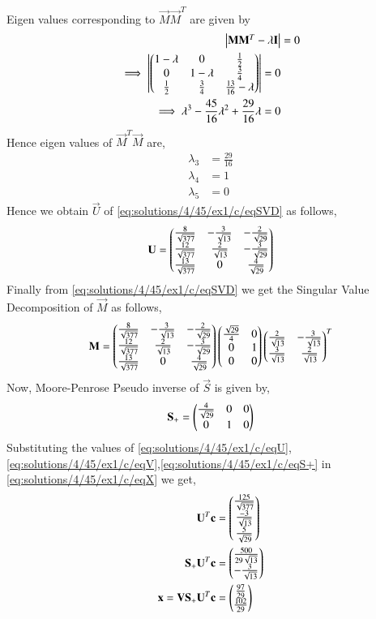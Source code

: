 Eigen values corresponding to $\vec{M}\Vec{M}^T$ are given by
\begin{align}
\begin{vmatrix}\mathbf{M}\mathbf{M}^T-\lambda\mathbf{I}\end{vmatrix} &= 0\\
\implies \begin{vmatrix}\begin{pmatrix}1-\lambda&0&\frac{1}{2}\\0&1-\lambda&\frac{3}{4}\\\frac{1}{2}&\frac{3}{4}&\frac{13}{16}-\lambda\end{pmatrix}\end{vmatrix}=0\\
\implies \lambda^3-\frac{45}{16}\lambda^2+\frac{29}{16}\lambda=0
\end{align}
Hence eigen values of $\vec{M}^T\vec{M}$ are,
\begin{align}
\lambda_3 &=\frac{29}{16}\\
\lambda_4 &= 1\\
\lambda_5 &= 0
\end{align}
Hence we obtain $\vec{U}$ of \eqref{eq:solutions/4/45/ex1/c/eqSVD} as follows,
\begin{align}
\mathbf{U}=\label{eq:solutions/4/45/ex1/c/eqU}\begin{pmatrix}\frac{8}{\sqrt{377}}&-\frac{3}{\sqrt{13}}&-\frac{2}{\sqrt{29}}\\\frac{12}{\sqrt{377}}&\frac{2}{\sqrt{13}}&-\frac{3}{\sqrt{29}}\\\frac{13}{\sqrt{377}}&0&\frac{4}{\sqrt{29}}\end{pmatrix}
\end{align}
Finally from \eqref{eq:solutions/4/45/ex1/c/eqSVD} we get the Singular Value Decomposition of $\vec{M}$ as follows,
\begin{align}
\mathbf{M} = \begin{pmatrix}\frac{8}{\sqrt{377}}&-\frac{3}{\sqrt{13}}&-\frac{2}{\sqrt{29}}\\\frac{12}{\sqrt{377}}&\frac{2}{\sqrt{13}}&-\frac{3}{\sqrt{29}}\\\frac{13}{\sqrt{377}}&0&\frac{4}{\sqrt{29}}\end{pmatrix}\begin{pmatrix}\frac{\sqrt{29}}{4}&0\\0&1\\0&0\end{pmatrix}\begin{pmatrix}\frac{2}{\sqrt{13}}&-\frac{3}{\sqrt{13}}\\ \frac{3}{\sqrt{13}}&\frac{2}{\sqrt{13}}\end{pmatrix}^T
\end{align}
Now, Moore-Penrose Pseudo inverse of $\vec{S}$ is given by,
\begin{align}
\mathbf{S_+} = \begin{pmatrix}\frac{4}{\sqrt{29}}&0&0\\0&1&0\end{pmatrix}\label{eq:solutions/4/45/ex1/c/eqS+}
\end{align}
Substituting the values of \eqref{eq:solutions/4/45/ex1/c/eqU},\eqref{eq:solutions/4/45/ex1/c/eqV},\eqref{eq:solutions/4/45/ex1/c/eqS+} in \eqref{eq:solutions/4/45/ex1/c/eqX}  we get,
\begin{align}
\mathbf{U}^T\mathbf{c}&=\begin{pmatrix}\frac{125}{\sqrt{377}}\\\frac{-3}{\sqrt{13}}\\\frac{5}{\sqrt{29}}\end{pmatrix}\\
\mathbf{S_+}\mathbf{U}^T\mathbf{c}&=\begin{pmatrix}\frac{500}{29\sqrt{13}}\\-\frac{3}{\sqrt{13}}\end{pmatrix}\\
\mathbf{x} = \mathbf{V}\mathbf{S_+}\mathbf{U}^T\mathbf{c} &= \begin{pmatrix}\frac{97}{29}\\\frac{102}{29}\end{pmatrix}\label{eq:solutions/4/45/ex1/c/eqXSol1}
\end{align}
